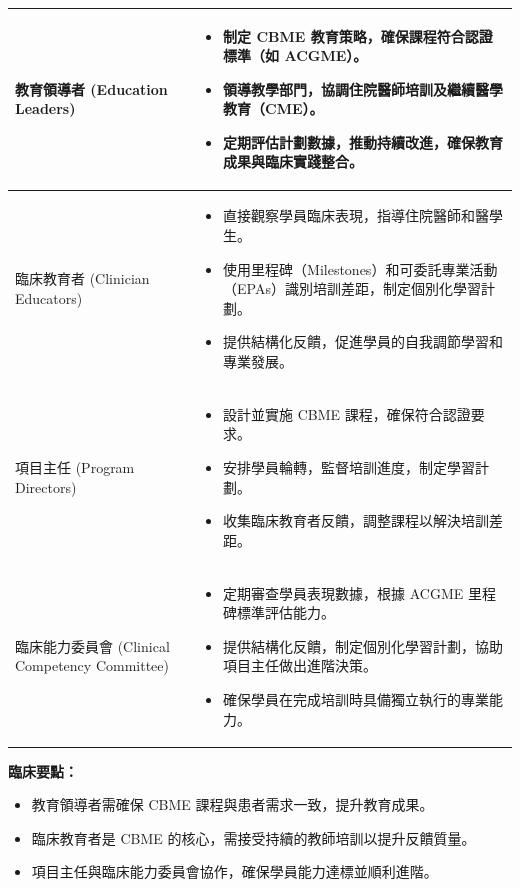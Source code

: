 \documentclass[12pt,a4paper]{article}
\begin{document}
\begin{longtable}{L{4cm} L{10cm}}
    教育領導者 \newline (Education Leaders) &
    \begin{itemize}[nosep]
        \item 制定 CBME 教育策略，確保課程符合認證標準（如 ACGME）。
        \item 領導教學部門，協調住院醫師培訓及繼續醫學教育（CME）。
        \item 定期評估計劃數據，推動持續改進，確保教育成果與臨床實踐整合。
    \end{itemize} \\
    \midrule
    臨床教育者 \newline (Clinician Educators) &
    \begin{itemize}[nosep]
        \item 直接觀察學員臨床表現，指導住院醫師和醫學生。
        \item 使用里程碑（Milestones）和可委託專業活動（EPAs）識別培訓差距，制定個別化學習計劃。
        \item 提供結構化反饋，促進學員的自我調節學習和專業發展。
    \end{itemize} \\
    \midrule
    項目主任 \newline (Program Directors) &
    \begin{itemize}[nosep]
        \item 設計並實施 CBME 課程，確保符合認證要求。
        \item 安排學員輪轉，監督培訓進度，制定學習計劃。
        \item 收集臨床教育者反饋，調整課程以解決培訓差距。
    \end{itemize} \\
    \midrule
    臨床能力委員會 \newline (Clinical Competency Committee) &
    \begin{itemize}[nosep]
        \item 定期審查學員表現數據，根據 ACGME 里程碑標準評估能力。
        \item 提供結構化反饋，制定個別化學習計劃，協助項目主任做出進階決策。
        \item 確保學員在完成培訓時具備獨立執行的專業能力。
    \end{itemize} \\
\end{longtable}

\begin{importantbox}
\textbf{臨床要點：}
\begin{itemize}[nosep]
    \item 教育領導者需確保 CBME 課程與患者需求一致，提升教育成果。
    \item 臨床教育者是 CBME 的核心，需接受持續的教師培訓以提升反饋質量。
    \item 項目主任與臨床能力委員會協作，確保學員能力達標並順利進階。
\end{itemize}
\end{importantbox}
\end{document}
